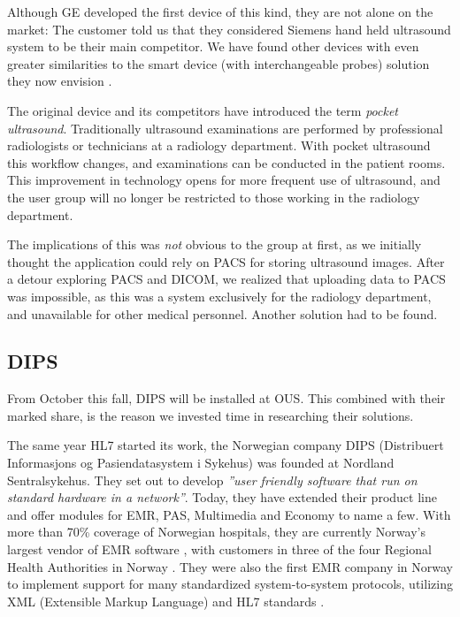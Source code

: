 \noindent
Although GE developed the first device of this kind, they are not alone on the market: The customer told us that they considered Siemens hand held ultrasound system \cite{ACUSONP10} to be their main competitor. We have found other devices with even greater similarities to the  smart device (with interchangeable probes) solution they now envision \cite{MobiUSSP1}.

The original device and its competitors have introduced the term \textit{pocket ultrasound}. Traditionally ultrasound examinations are performed by professional radiologists or technicians at a radiology department. With pocket ultrasound this workflow changes, and examinations can be conducted in the patient rooms. This improvement in technology opens for more frequent use of ultrasound, and the user group will no longer be restricted to those working in the radiology department. 

The implications of this was \emph{not} obvious to the group at first, as we initially thought the application could rely on PACS for storing ultrasound images. After a detour exploring PACS and DICOM, we realized that uploading data to PACS was impossible, as this was a system exclusively for the radiology department, and unavailable for other medical personnel. Another solution had to be found.




\subsection{DIPS}
\label{exsol}
From October this fall, DIPS will be installed at OUS. This combined with their marked share, is the reason we invested time in researching their solutions. 

The same year HL7 started its work, the Norwegian company DIPS (Distribuert Informasjons og Pasiendatasystem i Sykehus) was founded at Nordland Sentralsykehus. They set out to develop \emph{''user friendly software that run on standard hardware in a network''}. Today, they have extended their product line and offer modules for EMR, PAS, Multimedia and Economy to name a few. With more than 70\% coverage of Norwegian hospitals, they are currently Norway's largest vendor of EMR software \cite{DIPS}, with customers in three of the four Regional Health Authorities in Norway \cite{RHF}. They were also the first EMR company in Norway to implement support for many standardized system-to-system protocols, utilizing XML (Extensible Markup Language) and HL7 standards \cite{dips_pioneer}.

